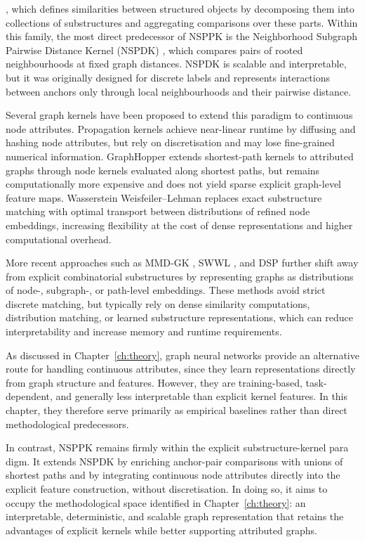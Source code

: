 \citep{haussler1999}, which defines similarities between structured objects by
decomposing them into collections of substructures and aggregating comparisons
over these parts. Within this family, the most direct predecessor of NSPPK is
the Neighborhood Subgraph Pairwise Distance Kernel (NSPDK)
\citep{costa2010fast}, which compares pairs of rooted neighbourhoods at fixed
graph distances. NSPDK is scalable and interpretable, but it was originally
designed for discrete labels and represents interactions between anchors only
through local neighbourhoods and their pairwise distance.

Several graph kernels have been proposed to extend this paradigm to continuous
node attributes. Propagation kernels \citep{neumann2016propagation} achieve
near-linear runtime by diffusing and hashing node attributes, but rely on
discretisation and may lose fine-grained numerical information. GraphHopper
\citep{feragen2013scalable} extends shortest-path kernels to attributed graphs
through node kernels evaluated along shortest paths, but remains
computationally more expensive and does not yield sparse explicit graph-level
feature maps. Wasserstein Weisfeiler--Lehman
\citep{togninalli2019wasserstein} replaces exact substructure matching with
optimal transport between distributions of refined node embeddings, increasing
flexibility at the cost of dense representations and higher computational
overhead.

More recent approaches such as MMD-GK \citep{mmdgk_iclr2024}, SWWL
\citep{carpintero2024swwl}, and DSP \citep{ye2025dsp} further shift away from
explicit combinatorial substructures by representing graphs as distributions of
node-, subgraph-, or path-level embeddings. These methods avoid strict discrete
matching, but typically rely on dense similarity computations, distribution
matching, or learned substructure representations, which can reduce
interpretability and increase memory and runtime requirements.

As discussed in Chapter~\ref{ch:theory}, graph neural networks provide an
alternative route for handling continuous attributes, since they learn
representations directly from graph structure and features. However, they are
training-based, task-dependent, and generally less interpretable than explicit
kernel features. In this chapter, they therefore serve primarily as empirical
baselines rather than direct methodological predecessors.

In contrast, NSPPK remains firmly within the explicit substructure-kernel para
digm. It extends NSPDK by enriching anchor-pair comparisons with unions of
shortest paths and by integrating continuous node attributes directly into the
explicit feature construction, without discretisation. In doing so, it aims to
occupy the methodological space identified in Chapter~\ref{ch:theory}: an
interpretable, deterministic, and scalable graph representation that retains
the advantages of explicit kernels while better supporting attributed graphs.





